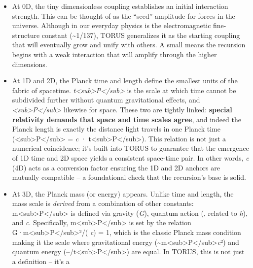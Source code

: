 \documentclass[
]{article}
\begin{document}
\begin{itemize}
\item
  At 0D, the tiny dimensionless coupling \alpha establishes an initial
  interaction strength. This can be thought of as the ``seed'' amplitude
  for forces in the universe. Although \alpha in our everyday physics is the
  electromagnetic fine-structure constant (\textasciitilde1/137), TORUS
  generalizes it as the starting coupling that will eventually grow and
  unify with others. A small \alpha means the recursion begins with a weak
  interaction that will amplify through the higher dimensions.
\item
  At 1D and 2D, the Planck time and length define the smallest units of
  the fabric of spacetime.
  \emph{t\textless sub\textgreater P\textless/sub\textgreater{}} is the
  scale at which time cannot be subdivided further without quantum
  gravitational effects, and
  \emph{\ell\textless sub\textgreater P\textless/sub\textgreater{}}
  likewise for space. These two are tightly linked: \textbf{special
  relativity demands that space and time scales agree}, and indeed the
  Planck length is exactly the distance light travels in one Planck time
  (\ell\textless sub\textgreater P\textless/sub\textgreater{} = \emph{c} ·
  t\textless sub\textgreater P\textless/sub\textgreater)\hspace{0pt}.
  This relation is not just a numerical coincidence; it's built into
  TORUS to guarantee that the emergence of 1D time and 2D space yields a
  consistent space-time pair. In other words, \emph{c} (4D) acts as a
  conversion factor ensuring the 1D and 2D anchors are mutually
  compatible -- a foundational check that the recursion's base is solid.
\item
  At 3D, the Planck mass (or energy) appears. Unlike time and length,
  the mass scale is \emph{derived} from a combination of other
  constants: m\textless sub\textgreater P\textless/sub\textgreater{} is
  defined via gravity (\emph{G}), quantum action (\emph{\hbar}, related to
  \emph{h}), and \emph{c}. Specifically,
  m\textless sub\textgreater P\textless/sub\textgreater{} is set by the
  relation
  G·m\textless sub\textgreater P\textless/sub\textgreater²/(\emph{\hbar}
  \emph{c}) = 1, which is the classic Planck mass condition making it
  the scale where gravitational energy
  (\textasciitilde m\textless sub\textgreater P\textless/sub\textgreater{}\emph{c}²)
  and quantum energy
  (\textasciitilde \hbar/t\textless sub\textgreater P\textless/sub\textgreater)
  are equal. In TORUS, this is not just a definition -- it's a

\end{itemize}
\end{document}
